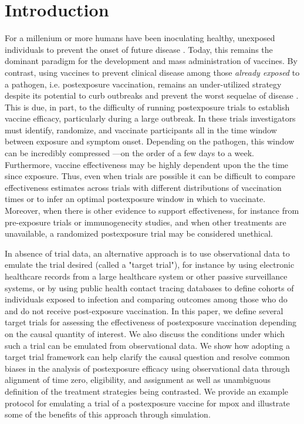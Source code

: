 \documentclass[11pt]{article}
\begin{document}
\section{Introduction} \label{sec:introduction}
For a millenium or more humans have been inoculating healthy, unexposed individuals to prevent the onset of future disease \cite{plotkin2012vaccines}. Today, this remains the dominant paradigm for the development and mass administration of vaccines. By contrast, using vaccines to prevent clinical disease among those \textit{already exposed} to a pathogen, i.e. postexposure vaccination, remains an under-utilized strategy despite its potential to curb outbreaks and prevent the worst sequelae of disease \cite{gallagher_postexposure_2019}. This is due, in part, to the difficulty of running postexposure trials to establish vaccine efficacy, particularly during a large outbreak. In these trials investigators must identify, randomize, and vaccinate participants all in the time window between exposure and symptom onset. Depending on the pathogen, this window can be incredibly compressed ---on the order of a few days to a week. Furthermore, vaccine effectiveness may be highly dependent upon the the time since exposure. Thus, even when trials are possible it can be difficult to compare effectiveness estimates across trials with different distributions of vaccination times or to infer an optimal postexposure window in which to vaccinate. Moreover, when there is other evidence to support effectiveness, for instance from pre-exposure trials or immunogenecity studies, and when other treatments are unavailable, a randomized postexposure trial may be considered unethical.

In absence of trial data, an alternative approach is to use observational data to emulate the trial desired \cite{hernan_observational_2008,hernan_using_2016} (called a "target trial"), for instance by using electronic healthcare records from a large healthcare system or other passive surveillance systems, or by using public health contact tracing databases to define cohorts of individuals exposed to infection and comparing outcomes among those who do and do not receive post-exposure vaccination. In this paper, we define several target trials for assessing the effectiveness of postexposure vaccination depending on the causal quantity of interest. We also discuss the conditions under which such a trial can be emulated from observational data. We show how adopting a target trial framework can help clarify the causal question and resolve common biases in the analysis of postexposure efficacy using observational data through alignment of time zero, eligibility, and assignment as well as unambiguous definition of the treatment strategies being contrasted. We provide an example protocol for emulating a trial of a postexposure vaccine for mpox and illustrate some of the benefits of this approach through simulation.
\end{document}
